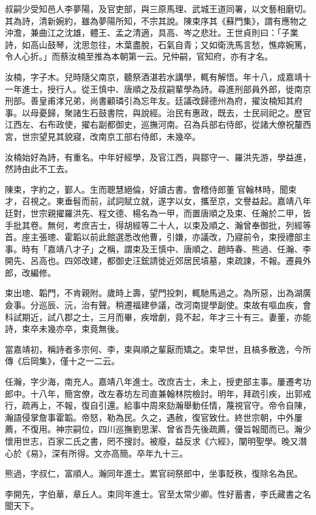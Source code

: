 \begin{pinyinscope}
叔嗣少受知邑人李夢陽，及官吏部，與三原馬理、武城王道同署，以文藝相磨切。其為詩，清新婉約，雖為夢陽所知，不宗其說。陳束序其《蘇門集》，謂有應物之沖澹，兼曲江之沈雄，體王、孟之清適，具高、岑之悲壯。王世貞則曰：「子業詩，如高山鼓琴，沈思忽往，木葉盡脫，石氣自青；又如衛洗馬言愁，憔瘁婉篤，令人心折。」而蔡汝楠至推為本朝第一云。兄仲嗣，官知府，亦有才名。

汝楠，字子木。兒時隨父南京，聽祭酒湛若水講學，輒有解悟。年十八，成嘉靖十一年進士，授行人。從王慎中、唐順之及叔嗣輩學為詩。尋進刑部員外郎，徙南京刑部。善皇甫涍兄弟，尚書顧璘引為忘年友。廷議改歸德州為府，擢汝楠知其府事。以母憂歸，聚諸生石鼓書院，與說經。治民有惠政，既去，士民祠祀之。歷官江西左、右布政使，擢右副都御史，巡撫河南。召為兵部右侍郎，從諸大僚祝釐西宮，世宗望見其貌寢，改南京工部右侍郎，未幾卒。

汝楠始好為詩，有重名。中年好經學，及官江西，與鄒守一、羅洪先游，學益進，然詩由此不工去。

陳束，字約之，鄞人。生而聰慧絕倫，好讀古書。會稽侍郎董官翰林時，聞束才，召視之。東垂髫而前，試詞賦立就，遂字以女，攜至京，文譽益起。嘉靖八年廷對，世宗親擢羅洪先、程文德、楊名為一甲，而置唐順之及束、任瀚於二甲，皆手批其卷。無何，考庶吉士，得胡經等二十人，以束及順之、瀚曾奉御批，列經等首。座主張璁、霍韜以前此館選悉改他曹，引嫌，亦議改，乃寢前令，束授禮部主事。時有「嘉靖八才子」之稱，謂束及王慎中、唐順之、趙時春、熊過、任瀚、李開先、呂高也。四郊改建，都御史汪鋐請徙近郊居民墳墓，束疏諫，不報。遷員外郎，改編修。

束出璁、韜門，不肯親附。歲時上壽，望門投刺，輒馳馬過之。為所惡，出為湖廣僉事。分巡辰、沅，治有聲。稍遷福建參議，改河南提學副使。束故有嘔血疾，會科試期近，試八郡之士，三月而畢，疾增劇，竟不起，年才三十有三。妻董，亦能詩，束卒未幾亦卒，束竟無後。

當嘉靖初，稱詩者多宗何、李，束與順之輩厭而矯之。束早世，且槁多散逸，今所傳《后岡集》，僅十之一二云。

任瀚，字少海，南充人。嘉靖八年進士。改庶吉士，未上，授吏部主事。屢遷考功郎中。十八年，簡宮僚，改左春坊左司直兼翰林院檢討。明年，拜疏引疾，出郭戒行，疏再上，不報，復自引還。給事中周來劾瀚舉動任情，蔑視官守。帝令自陳，瀚語侵掌詹事霍韜。帝怒，勒為民。久之，遇赦，復官致仕。終世宗朝，中外屢薦，不復用。神宗嗣位，四川巡撫劉思潔、曾省吾先後疏薦，優旨報聞而已。瀚少懷用世志，百家二氏之書，罔不搜討。被廢，益反求《六經》，闡明聖學。晚又潛心於《易》，深有所得。文亦高簡。卒年九十三。

熊過，字叔仁，富順人。瀚同年進士。累官祠祭郎中，坐事貶秩，復除名為民。

李開先，字伯華，章丘人。束同年進士。官至太常少卿。性好蓄書，李氏藏書之名聞天下。


\end{pinyinscope}
